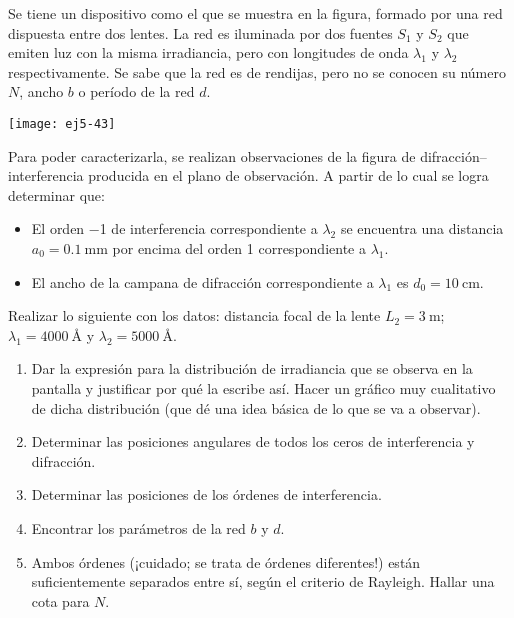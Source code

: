 \item 
\begin{minipage}[t][3.3cm]{0.6\textwidth}
Se tiene un dispositivo como el que se muestra en la figura, formado por una red dispuesta entre dos lentes. La red es iluminada por dos fuentes $S_1$ y $S_2$ que emiten luz con la misma irradiancia, pero con longitudes de onda $\lambda_1$ y $\lambda_2$ respectivamente.
Se sabe que la red es de rendijas, pero no se conocen su número \(N\), ancho \(b\) o período de la red \(d\).
\end{minipage}
\begin{minipage}[c][0cm][t]{0.35\textwidth}
	\texttt{[image: ej5-43]}
\end{minipage}
Para poder caracterizarla, se realizan observaciones de la figura de difracción--interferencia producida en el plano de observación.
A partir de lo cual se logra determinar que:
\begin{itemize}
	\item El orden \num{-1} de interferencia correspondiente a $\lambda_2$ se encuentra una distancia $a_0= \SI{0.1}{\milli\metre}$ por encima del orden \num{+1} correspondiente a $\lambda_1$. 
	\item El ancho de la campana de difracción correspondiente a $\lambda_1$ es $d_0= \SI{10}{\centi\metre}$.
\end{itemize}
Realizar lo siguiente con los datos: distancia focal de la lente $L_2 = \SI{3}{\metre}$; $\lambda_1 = \SI{4000}{\angstrom}$ y $\lambda_2 = \SI{5000}{\angstrom}$.
\begin{enumerate}
	\item Dar la expresión para la distribución de irradiancia que se observa en la pantalla y justificar por qué la escribe así.
	Hacer un gráfico muy cualitativo de dicha distribución (que dé una idea básica de lo que se va a observar).
	\item Determinar las posiciones angulares de todos los ceros de interferencia y difracción. 
	\item Determinar las posiciones de los órdenes de interferencia.
	\item Encontrar los parámetros de la red $b$ y $d$. 
	\item Ambos órdenes (¡cuidado; se trata de órdenes diferentes!) están suficientemente separados entre sí, según el criterio de Rayleigh.
	Hallar una cota	para $N$. 
\end{enumerate}
